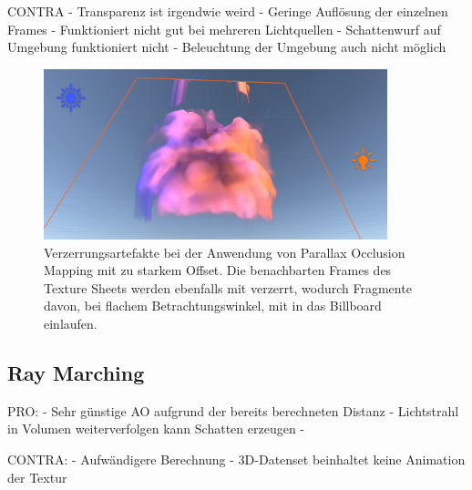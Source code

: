 CONTRA\newline
- Transparenz ist irgendwie weird\newline
- Geringe Auflösung der einzelnen Frames \newline
- Funktioniert nicht gut bei mehreren Lichtquellen\newline
- Schattenwurf auf Umgebung funktioniert nicht\newline
- Beleuchtung der  Umgebung auch nicht möglich\newline

\begin{figure}[h!]
	\includegraphics[width=0.89\textwidth]{Grafiken/Evaluation/Smoke_artefacts.png}
	\centering
	\begin{footnotesize}
		\caption{Verzerrungsartefakte bei der Anwendung von Parallax Occlusion Mapping mit zu starkem Offset. Die benachbarten Frames des Texture Sheets
			werden ebenfalls mit verzerrt, wodurch Fragmente davon, bei flachem Betrachtungswinkel, mit in das Billboard einlaufen.}
		\label{fig:smokeBleeding}
	\end{footnotesize}
\end{figure}



\subsection{Ray Marching}
\label{sec:5.2}

PRO: \newline
- Sehr günstige AO aufgrund der bereits berechneten Distanz\newline
- Lichtstrahl in Volumen weiterverfolgen kann Schatten erzeugen\newline
-

CONTRA: \newline
- Aufwändigere Berechnung\newline
- 3D-Datenset beinhaltet keine Animation der Textur\newline




